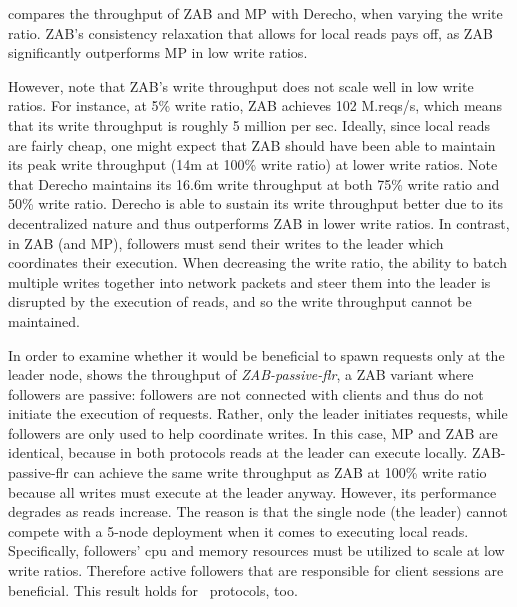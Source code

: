  compares the throughput of ZAB and MP with Derecho, when varying the write ratio.
ZAB's consistency relaxation that allows for local reads pays off, as ZAB significantly outperforms MP in low write ratios. 

However, note that ZAB's write throughput does not scale well in low write ratios. For instance, at 5\% write ratio, ZAB achieves 102 M.reqs/s, which means that its write throughput is roughly 5 million per sec. Ideally, since local reads are fairly cheap, one might expect that ZAB should have been able to maintain its peak write throughput (14m at 100\% write ratio) at lower write ratios. Note that Derecho maintains its 16.6m write throughput at both 75\% write ratio and 50\% write ratio. Derecho is able to sustain its write throughput better due to its decentralized nature and thus outperforms ZAB in lower write ratios. In contrast, in ZAB (and MP), followers must send their writes to the leader which coordinates their execution. When decreasing the write ratio, the ability to batch multiple writes together into network packets and steer them into the leader is disrupted by the execution of reads, and so the write throughput cannot be maintained.



In order to examine whether it would be beneficial to spawn requests only at the leader node,  shows the throughput of \emph{ZAB-passive-flr}, a ZAB variant where followers are passive: \ie followers are not connected with clients and thus do not initiate the execution of requests. Rather, only the leader initiates requests, while followers are only used to help coordinate writes. 
In this case, MP and ZAB are identical, because in both protocols reads at the leader can execute locally.
ZAB-passive-flr can achieve the same write throughput as ZAB at 100\% write ratio because all writes must execute at the leader anyway. However, its performance degrades as reads increase. The reason is that the single node (\ie the leader) cannot compete with a 5-node deployment when it comes to executing local reads. Specifically, followers' cpu and memory resources must be utilized to scale at low write ratios. Therefore active followers that are responsible for client sessions are beneficial. This result holds for \LPKO~protocols, too.

